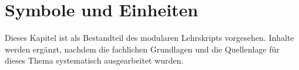 \chapter{Symbole und Einheiten}
\label{chap:b-symbole-einheiten}

Dieses Kapitel ist als Bestandteil des modularen Lehrskripts vorgesehen.
Inhalte werden ergänzt, nachdem die fachlichen Grundlagen und die
Quellenlage für dieses Thema systematisch ausgearbeitet wurden.
